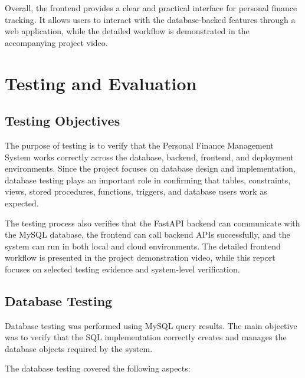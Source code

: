 ﻿\documentclass{article}
\begin{document}
Overall, the frontend provides a clear and practical interface for personal finance tracking. It allows users to interact with the database-backed features through a web application, while the detailed workflow is demonstrated in the accompanying project video.

\section{Testing and Evaluation}
\label{sec:testing-evaluation}

\subsection{Testing Objectives}

The purpose of testing is to verify that the Personal Finance Management System works correctly across the database, backend, frontend, and deployment environments. Since the project focuses on database design and implementation, database testing plays an important role in confirming that tables, constraints, views, stored procedures, functions, triggers, and database users work as expected.

The testing process also verifies that the FastAPI backend can communicate with the MySQL database, the frontend can call backend APIs successfully, and the system can run in both local and cloud environments. The detailed frontend workflow is presented in the project demonstration video, while this report focuses on selected testing evidence and system-level verification.

\subsection{Database Testing}

Database testing was performed using MySQL query results. The main objective was to verify that the SQL implementation correctly creates and manages the database objects required by the system.

The database testing covered the following aspects:
\end{document}
